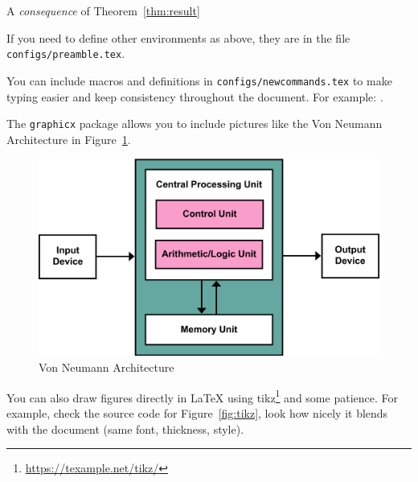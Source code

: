 \begin{corollary}
A \emph{consequence} of Theorem~\ref{thm:result}
\end{corollary}

If you need to define other environments as above, they are in the
file \texttt{configs/preamble.tex}.

You can include macros and definitions in \texttt{configs/newcommands.tex} to make typing easier and keep consistency throughout the document. For example: .

The \texttt{graphicx} package allows you to include pictures like the Von Neumann Architecture in Figure~\ref{fig:von_neumann_arch}.

\begin{figure}
    \centering
    \includegraphics[scale=2]{images/Von_Neumann_Architecture.png}
    \caption{Von Neumann Architecture}
    \label{fig:von_neumann_arch}
\end{figure}

You can also draw figures directly in \LaTeX{} using tikz\footnote{\url{https://texample.net/tikz/}} and some patience. For example, check the source code for Figure~\ref{fig:tikz}, look how nicely it blends with the document (same font, thickness, style).

